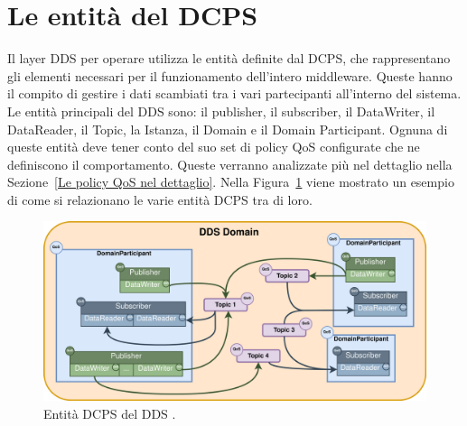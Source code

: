 









\section{Le entità del DCPS}
Il layer DDS per operare utilizza le entità definite dal DCPS, 
che rappresentano gli elementi necessari
per il funzionamento dell'intero middleware. Queste hanno il compito di 
gestire i dati
scambiati tra i vari partecipanti all'interno del sistema. 
Le entità principali del DDS sono: 
il publisher, il subscriber, il DataWriter, il DataReader, il Topic,
la Istanza, il Domain e il Domain Participant.
Ognuna di queste entità deve tener conto del suo set di policy 
QoS configurate
che ne definiscono il comportamento. Queste verranno analizzate 
più nel dettaglio nella Sezione~\ref{Le policy QoS nel dettaglio}.
Nella Figura~\ref{entitadcps} viene mostrato un esempio di 
come si relazionano 
le varie entità DCPS tra di loro.

\begin{figure}[H]
    \centering
    \includegraphics[width=15.2cm, keepaspectratio]{img/entitadcps .png}
    \caption{Entità DCPS del DDS
    \cite{whatddseprosima}.}
    \label{entitadcps}
\end{figure}



